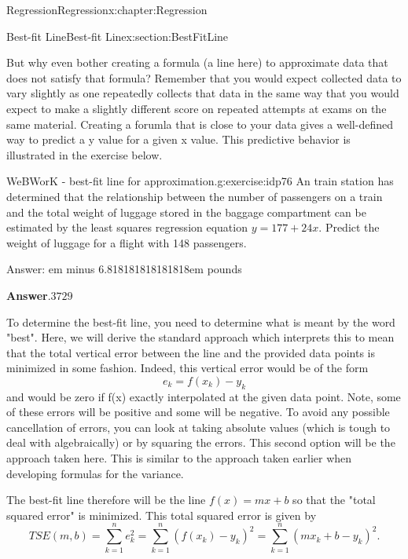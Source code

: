 \documentclass[oneside,10pt,]{book}
\newcommand{\blocktitlefont}{\relax}
\newcommand{\fillin}[1]{\leavevmode\leaders\vrule height -1.2pt depth 1.5pt \hskip #1em minus #1em \null}
\numberwithin{equation}{section}
\begin{document}
\begin{chapterptx}{Regression}{}{Regression}{}{}{x:chapter:Regression}
\begin{sectionptx}{Best-fit Line}{}{Best-fit Line}{}{}{x:section:BestFitLine}
\par
But why even bother creating a formula (a line here) to approximate data that does not satisfy that formula? Remember that you would expect collected data to vary slightly as one repeatedly collects that data in the same way that you would expect to make a slightly different score on repeated attempts at exams on the same material. Creating a forumla that is close to your data gives a well-defined way to predict a y value for a given x value. This predictive behavior is illustrated in the exercise below.%
\begin{inlineexercise}{WeBWorK - best-fit line for approximation.}{g:exercise:idp76}%
An train station has determined that the relationship between the number of passengers on a train and the total weight of luggage stored in the baggage compartment can be estimated by the least squares regression equation \(y = 177 + 24 x\). Predict the weight of luggage for a flight with 148 passengers.%
\par
Answer: \fillin{6.818181818181818} pounds%
\par\smallskip%
\noindent\textbf{\blocktitlefont Answer}.\hypertarget{g:answer:idp77}{}\quad{}\(3729\)%
\end{inlineexercise}%
To determine the best-fit line, you need to determine what is meant by the word "best". Here, we will derive the standard approach which interprets this to mean that the total vertical error between the line and the provided data points is minimized in some fashion.  Indeed, this vertical error would be of the form%
\begin{equation*}
e_k = f(x_k) - y_k
\end{equation*}
and would be zero if f(x) exactly interpolated at the given data point.  Note, some of these errors will be positive and some will be negative. To avoid any possible cancellation of errors, you can look at taking absolute values (which is tough to deal with algebraically) or by squaring the errors. This second option will be the approach taken here. This is similar to the approach taken earlier when developing formulas for the variance.%
\par
The best-fit line therefore will be the line \(f(x) = mx+b\) so that the "total squared error" is minimized. This total squared error is given by%
\begin{equation*}
TSE(m,b) = \sum_{k=1}^n e_k^2 = \sum_{k=1}^n (f(x_k) - y_k)^2 = \sum_{k=1}^n (m x_k + b - y_k)^2.
\end{equation*}
%
\par

\end{sectionptx}
\end{chapterptx}
\end{document}
